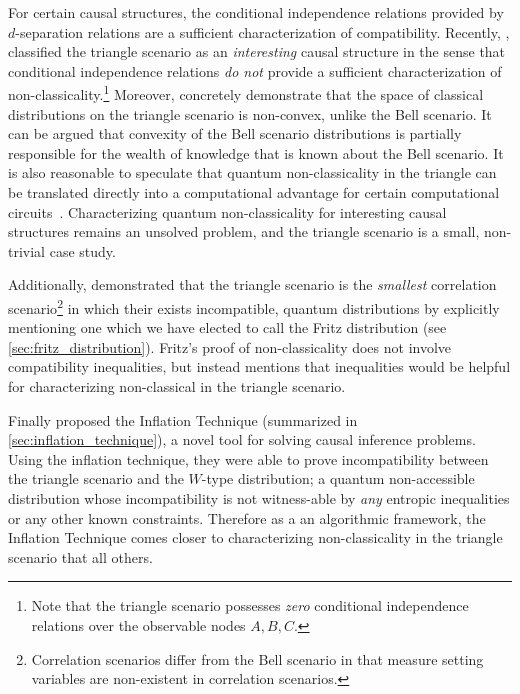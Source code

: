 \documentclass[aps, 10pt, english, twoside, pra, nofootinbib, tightenlines, longbibliography]{revtex4-1}
\begin{document}
    For certain causal structures, the conditional independence relations provided by $d$-separation relations are a sufficient characterization of compatibility. Recently, \citet{Henson_2014}, classified the triangle scenario as an \textit{interesting} causal structure in the sense that conditional independence relations \textit{do not} provide a sufficient characterization of non-classicality.\footnote{Note that the triangle scenario possesses \textit{zero} conditional independence relations over the observable nodes $A, B, C$.} Moreover, \citet{Inflation} concretely demonstrate that the space of classical distributions on the triangle scenario is non-convex, unlike the Bell scenario. It can be argued that convexity of the Bell scenario distributions is partially responsible for the wealth of knowledge that is known about the Bell scenario. It is also reasonable to speculate that quantum non-classicality in the triangle can be translated directly into a computational advantage for certain computational circuits~\cite{Terhal_2002}. Characterizing quantum non-classicality for interesting causal structures remains an unsolved problem, and the triangle scenario is a small, non-trivial case study.

    Additionally, \citet{Fritz_2012} demonstrated that the triangle scenario is the \textit{smallest} correlation scenario\footnote{Correlation scenarios differ from the Bell scenario in that measure setting variables are non-existent in correlation scenarios.} in which their exists incompatible, quantum distributions by explicitly mentioning one which we have elected to call the Fritz distribution (see \cref{sec:fritz_distribution}). Fritz's proof of non-classicality does not involve compatibility inequalities, but instead mentions that inequalities would be helpful for characterizing non-classical in the triangle scenario.

    Finally \citet{Inflation} proposed the Inflation Technique (summarized in \cref{sec:inflation_technique}), a novel tool for solving causal inference problems. Using the inflation technique, they were able to prove incompatibility between the triangle scenario and the $W$-type distribution; a quantum non-accessible distribution whose incompatibility is not witness-able by \textit{any} entropic inequalities or any other known constraints. Therefore as a an algorithmic framework, the Inflation Technique comes closer to characterizing non-classicality in the triangle scenario that all others.
\end{document}
